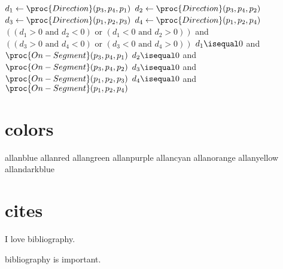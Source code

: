 \documentclass{article}
\begin{document}
        \begin{codebox}
            \li $d_1 \gets \proc{Direction}(p_3, p_4, p_1)$
            \li $d_2 \gets \proc{Direction}(p_3, p_4, p_2)$
            \li $d_3 \gets \proc{Direction}(p_1, p_2, p_3)$
            \li $d_4 \gets \proc{Direction}(p_1, p_2, p_4)$
            \li \If $((d_1 > 0 \mbox{ and } d_2 < 0) \mbox{ or }
            (d_1 < 0 \mbox{ and } d_2 > 0))$ and
            \Indentmore
            \zi $((d_3 > 0 \mbox{ and } d_4 < 0) \mbox{ or }
            (d_3 < 0 \mbox{ and } d_4 > 0))$
            \End
            \li \Then \Return {}
            \li \ElseIf $d_1 \isequal 0$ and $\proc{On-Segment}(p_3, p_4, p_1)$
            \li \Then \Return {}
            \li \ElseIf $d_2 \isequal 0$ and $\proc{On-Segment}(p_3, p_4, p_2)$
            \li \Then \Return {}
            \li \ElseIf $d_3 \isequal 0$ and $\proc{On-Segment}(p_1, p_2, p_3)$
            \li \Then \Return {}
            \li \ElseIf $d_4 \isequal 0$ and $\proc{On-Segment}(p_1, p_2, p_4)$
            \li \Then \Return {}
            \li \ElseNoIf \Return {}
            \End
        \end{codebox}
    \section{colors}
        \color{allanblue} allanblue \color{black}
        \color{allanred} allanred \color{black}
        \color{allangreen} allangreen \color{black}
        \color{allanpurple} allanpurple \color{black}
        \color{allancyan} allancyan \color{black}
        \color{allanorange} allanorange \color{black}
        \color{allanyellow} allanyellow \color{black}
        \color{allandarkblue} allandarkblue \color{black}
    \section{cites}
        I love bibliography. \cite{bibliography}
    \begin{thebibliography}{30}
         bibliography is important.
    \end{thebibliography}
\end{document}
